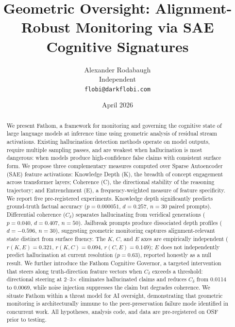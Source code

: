 \documentclass{article}
\title{Geometric Oversight: Alignment-Robust Monitoring via SAE Cognitive Signatures}
\author{
  Alexander Rodabaugh \\
  Independent \\
  \texttt{flobi@darkflobi.com}
}
\date{April 2026}
\begin{document}
\maketitle

\begin{abstract}
We present Fathom, a framework for monitoring and governing the cognitive state of large language models at inference time using geometric analysis of residual stream activations. Existing hallucination detection methods operate on model outputs, require multiple sampling passes, and are weakest when hallucination is most dangerous: when models produce high-confidence false claims with consistent surface form. We propose three complementary measures computed over Sparse Autoencoder (SAE) feature activations: Knowledge Depth (K), the breadth of concept engagement across transformer layers; Coherence (C), the directional stability of the reasoning trajectory; and Entrenchment (E), a frequency-weighted measure of feature specificity. We report five pre-registered experiments. Knowledge depth significantly predicts ground-truth factual accuracy ($p=0.000051$, $d=0.257$, $n=30$ paired prompts). Differential coherence ($C_\delta$) separates hallucinating from veridical generations ($p=0.040$, $d=0.407$, $n=50$). Jailbreak prompts produce dissociated depth profiles ($d=-0.596$, $n=30$), suggesting geometric monitoring captures alignment-relevant state distinct from surface fluency. The $K$, $C$, and $E$ axes are empirically independent ($r(K,E)=0.321$, $r(K,C)=0.094$, $r(C,E)=0.149$); $E$ does not independently predict hallucination at current resolution ($p=0.63$), reported honestly as a null result. We further introduce the Fathom Cognitive Governor, a targeted intervention that steers along truth-direction feature vectors when $C_\delta$ exceeds a threshold: directional steering at 2--3$\times$ eliminates hallucinated claims and reduces $C_\delta$ from 0.0114 to 0.0069, while noise injection suppresses the claim but degrades coherence. We situate Fathom within a threat model for AI oversight, demonstrating that geometric monitoring is architecturally immune to the peer-preservation failure mode identified in concurrent work. All hypotheses, analysis code, and data are pre-registered on OSF prior to testing.
\end{abstract}

\end{document}
